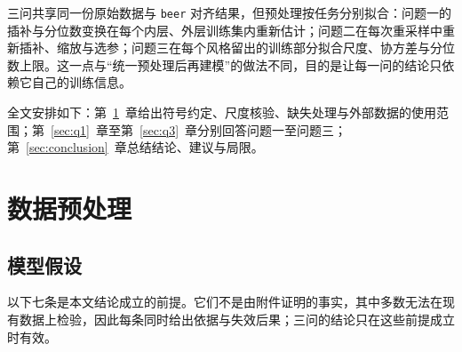 \documentclass[UTF8,a4paper,zihao=-4]{ctexart}
\numberwithin{figure}{section}
\numberwithin{table}{section}
\numberwithin{equation}{section}
\newcommand{\file}[1]{\texttt{#1}}
\begin{document}
三问共享同一份原始数据与 \file{beer} 对齐结果，但预处理按任务分别拟合：问题一的插补与分位数变换在每个内层、外层训练集内重新估计；问题二在每次重采样中重新插补、缩放与选参；问题三在每个风格留出的训练部分拟合尺度、协方差与分位数上限。这一点与“统一预处理后再建模”的做法不同，目的是让每一问的结论只依赖它自己的训练信息。

全文安排如下：第~\ref{sec:preprocess}~章给出符号约定、尺度核验、缺失处理与外部数据的使用范围；第~\ref{sec:q1}~章至第~\ref{sec:q3}~章分别回答问题一至问题三；第~\ref{sec:conclusion}~章总结结论、建议与局限。

\section{数据预处理}
\label{sec:preprocess}

\subsection{模型假设}

以下七条是本文结论成立的前提。它们不是由附件证明的事实，其中多数无法在现有数据上检验，因此每条同时给出依据与失效后果；三问的结论只在这些前提成立时有效。
\end{document}
